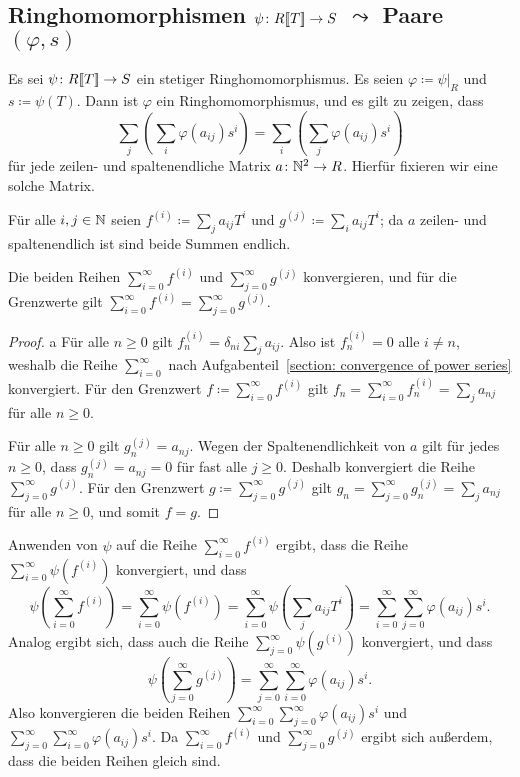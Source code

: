 \documentclass[a4paper, 10pt, numbers=noenddot]{scrartcl}
\begin{document}
\subsection*{Ringhomomorphismen $\psi \colon R[\![T]\!] \to S$ $\leadsto$ Paare $(\varphi, s)$}

Es sei $\psi \colon R[\![T]\!] \to S$ ein stetiger Ringhomomorphismus.
Es seien $\varphi \coloneqq \psi|_R$ und $s \coloneqq \psi(T)$.
Dann ist $\varphi$ ein Ringhomomorphismus, und es gilt zu zeigen, dass
\[
    \sum_j \left( \sum_i \varphi(a_{ij}) s^i \right)
  = \sum_i \left( \sum_j \varphi(a_{ij}) s^i \right)
\]
für jede zeilen- und spaltenendliche Matrix $a \colon \mathbb{N}^2 \to R$.
Hierfür fixieren wir eine solche Matrix.

Für alle $i, j \in \mathbb{N}$ seien $f^{(i)} \coloneqq \sum_j a_{ij} T^i$ und $g^{(j)} \coloneqq \sum_i a_{ij} T^i$;
da $a$ zeilen- und spaltenendlich ist sind beide Summen endlich.

\begin{claim}
  Die beiden Reihen $\sum_{i=0}^\infty f^{(i)}$ und $\sum_{j=0}^\infty g^{(j)}$ konvergieren, und für die Grenzwerte gilt $\sum_{i=0}^\infty f^{(i)} = \sum_{j=0}^\infty g^{(j)}$.
\end{claim}

\begin{proof}a
  Für alle $n \geq 0$ gilt $f^{(i)}_n = \delta_{ni} \sum_j a_{ij}$.
  Also ist $f^{(i)}_n = 0$ alle $i \neq n$, weshalb die Reihe $\sum_{i=0}^\infty$ nach Aufgabenteil~\ref{section: convergence of power series} konvergiert.
  Für den Grenzwert $f \coloneqq \sum_{i=0}^\infty f^{(i)}$ gilt $f_n = \sum_{i=0}^\infty f^{(i)}_n = \sum_j a_{nj}$ für alle $n \geq 0$.
  
  Für alle $n \geq 0$ gilt $g^{(j)}_n = a_{nj}$.
  Wegen der Spaltenendlichkeit von $a$ gilt für jedes $n \geq 0$, dass $g^{(j)}_n = a_{nj} = 0$ für fast alle $j \geq 0$.
  Deshalb konvergiert die Reihe $\sum_{j=0}^\infty g^{(j)}$.
  Für den Grenzwert $g \coloneqq \sum_{j=0}^\infty g^{(j)}$ gilt $g_n = \sum_{j=0}^\infty g^{(j)}_n = \sum_j a_{nj}$ für alle $n \geq 0$, und somit $f = g$.
\end{proof}

Anwenden von $\psi$ auf die Reihe $\sum_{i=0}^\infty f^{(i)}$ ergibt, dass die Reihe $\sum_{i=0}^\infty \psi(f^{(i)})$ konvergiert, und dass
\[
    \psi\left( \sum_{i=0}^\infty f^{(i)} \right)
  = \sum_{i=0}^\infty \psi(f^{(i)})
  = \sum_{i=0}^\infty \psi\left( \sum_j a_{ij} T^i \right)
  = \sum_{i=0}^\infty \sum_{j=0}^\infty \varphi(a_{ij}) s^i.
\]
Analog ergibt sich, dass auch die Reihe $\sum_{j=0}^\infty \psi(g^{(i)})$ konvergiert, und dass
\[
    \psi\left( \sum_{j=0}^\infty g^{(j)} \right)
  = \sum_{j=0}^\infty \sum_{i=0}^\infty \varphi(a_{ij}) s^i.
\]
Also konvergieren die beiden Reihen $\sum_{i=0}^\infty \sum_{j=0}^\infty \varphi(a_{ij}) s^i$ und $\sum_{j=0}^\infty \sum_{i=0}^\infty \varphi(a_{ij}) s^i$.
Da $\sum_{i=0}^\infty f^{(i)}$ und $\sum_{j=0}^\infty g^{(j)}$ ergibt sich außerdem, dass die beiden Reihen gleich sind.
\end{document}
